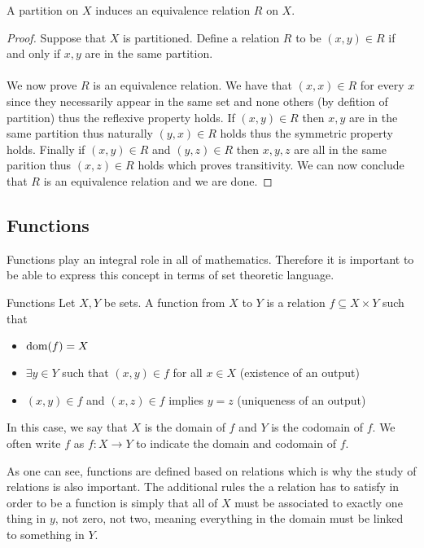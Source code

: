 \documentclass[a4paper]{article}
\begin{document}
\begin{thm}{}{} A partition on $X$ induces an equivalence relation $R$ on $X$. \tcbline
\begin{proof} Suppose that $X$ is partitioned. Define a relation $R$ to be $(x,y)\in R$ if and only if $x,y$ are in the same partition. \\~\\

We now prove $R$ is an equivalence relation. We have that $(x,x)\in R$ for every $x$ since they necessarily appear in the same set and none others (by defition of partition) thus the reflexive property holds. If $(x,y)\in R$ then $x,y$ are in the same partition thus naturally $(y,x)\in R$ holds thus the symmetric property holds. Finally if $(x,y)\in R$ and $(y,z)\in R$ then $x,y,z$ are all in the same parition thus $(x,z)\in R$ holds which proves transitivity. We can now conclude that $R$ is an equivalence relation and we are done. 
\end{proof}
\end{thm}

\subsection{Functions}
Functions play an integral role in all of mathematics. Therefore it is important to be able to express this concept in terms of set theoretic language. 
\begin{defn}{Functions}{} Let $X,Y$ be sets. A function from $X$ to $Y$ is a relation $f\subseteq X\times Y$ such that
\begin{itemize}
\item $\operatorname{dom}(f)=X$
\item $\exists y\in Y$ such that $(x,y)\in f$ for all $x\in X$ (existence of an output)
\item $(x,y)\in f$ and $(x,z)\in f$ implies $y=z$ (uniqueness of an output)
\end{itemize}
In this case, we say that $X$ is the domain of $f$ and $Y$ is the codomain of $f$. We often write $f$ as $f:X\to Y$ to indicate the domain and codomain of $f$. 
\end{defn}

As one can see, functions are defined based on relations which is why the study of relations is also important. The additional rules the a relation has to satisfy in order to be a function is simply that all of $X$ must be associated to exactly one thing in $y$, not zero, not two, meaning everything in the domain must be linked to something in $Y$. \\~\\
\end{document}
